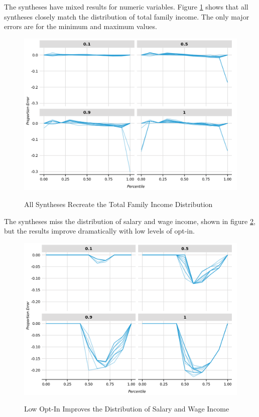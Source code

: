 \documentclass[
]{urban-formatting}
\begin{document}
The syntheses have mixed results for numeric variables. Figure
\ref{fig:family-income} shows that all syntheses closely match the
distribution of total family income. The only major errors are for the
minimum and maximum values.

\begin{figure}[!htb]
    \caption{All Syntheses Recreate the Total Family Income Distribution}
    \centering
    \includegraphics[width=6.5in]{../analysis/figures/percentiles-2.png}
    \label{fig:family-income}
\end{figure}

The syntheses miss the distribution of salary and wage income, shown in
figure \ref{fig:wage-income}, but the results improve dramatically with
low levels of opt-in.

\begin{figure}[!htb]
    \caption{Low Opt-In Improves the Distribution of Salary and Wage Income}
    \centering
    \includegraphics[width=6.5in]{../analysis/figures/percentiles-1.png}
    \label{fig:wage-income}
\end{figure}
\end{document}
